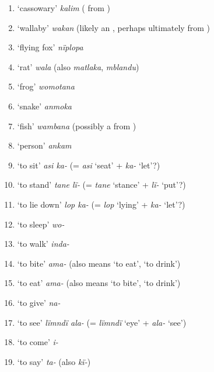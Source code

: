 \begin{enumerate}[noitemsep, label={\arabic*}, align=left, widest=190, labelsep=1ex,leftmargin=*]
\item  ‘cassowary’ \textit{kalim} ( from )

\item  ‘wallaby’ \textit{wakan} (likely an , perhaps ultimately from )

\item  ‘flying fox’ \textit{nïplopa}

\item  ‘rat’ \textit{wala} (also \textit{matlaka}, \textit{mblandu})

\item  ‘frog’ \textit{womotana}

\item  ‘snake’ \textit{anmoka}

\item  ‘fish’ \textit{wambana} (possibly a  from )

\item  ‘person’ \textit{ankam}

\item  ‘to sit’ \textit{asi ka-} (= \textit{asi} ‘seat’ + \textit{ka-} ‘let’?)

\item  ‘to stand’ \textit{tane lï-} (= \textit{tane} ‘stance’ + \textit{lï-} ‘put’?)

\item  ‘to lie down’ \textit{lop ka-} (= \textit{lop} ‘lying’ + \textit{ka-} ‘let’?)

\item  ‘to sleep’ \textit{wo-}

\item  ‘to walk’ \textit{inda-}

\item  ‘to bite’ \textit{ama-} (also means ‘to eat’, ‘to drink’)

\item  ‘to eat’ \textit{ama-} (also means ‘to bite’, ‘to drink’)

\item  ‘to give’ \textit{na-}

\item  ‘to see’ \textit{lïmndï ala-} (= \textit{lïmndï} ‘eye’ + \textit{ala-} ‘see’)

\item  ‘to come’ \textit{i-}

\item  ‘to say’ \textit{ta-} (also \textit{kï-})


\end{enumerate}
